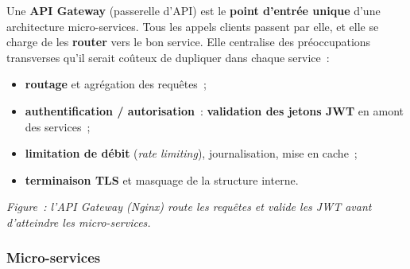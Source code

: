 \noindent Une \textbf{API Gateway} (passerelle d'API) est le \textbf{point d'entrée unique} d'une architecture micro-services. Tous les appels clients passent par elle, et elle se charge de les \textbf{router} vers le bon service. Elle centralise des préoccupations transverses qu'il serait coûteux de dupliquer dans chaque service~:
\begin{itemize}
	\item \textbf{routage} et agrégation des requêtes~;
	\item \textbf{authentification / autorisation}~: \textbf{validation des jetons JWT} en amont des services~;
	\item \textbf{limitation de débit} (\textit{rate limiting}), journalisation, mise en cache~;
	\item \textbf{terminaison TLS} et masquage de la structure interne.
\end{itemize}
\begin{center}
\end{center}
\noindent\textit{Figure~: l'API Gateway (Nginx) route les requêtes et valide les JWT avant d'atteindre les micro-services.}

\newpage

\subsubsection*{Micro-services}
{}

